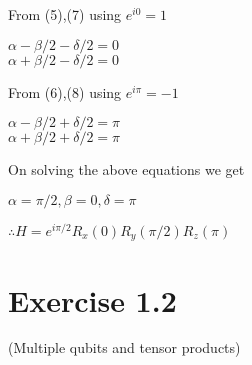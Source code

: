 \documentclass[a4paper,12pt]{article}
\begin{document}
\begin{enumerate}[label=(\alph*)]
          From (5),(7) using $e^{i0} = 1$

          $\alpha - \beta / 2 - \delta /  2 = 0$\\
          $\alpha + \beta / 2 - \delta /  2 = 0$

          From (6),(8) using $e^{i\pi} = -1$


          $\alpha - \beta / 2 + \delta /  2 = \pi$\\
          $\alpha + \beta / 2 + \delta /  2 = \pi$


          On solving the above equations we get

          $\alpha = \pi / 2, \beta = 0, \delta = \pi$

          $\therefore H = e^{i\pi / 2}R_{x}(0)R_{y}(\pi / 2)R_{z}(\pi)$


\end{enumerate}

\section*{Exercise 1.2}

 (Multiple qubits and tensor products)
\end{document}
